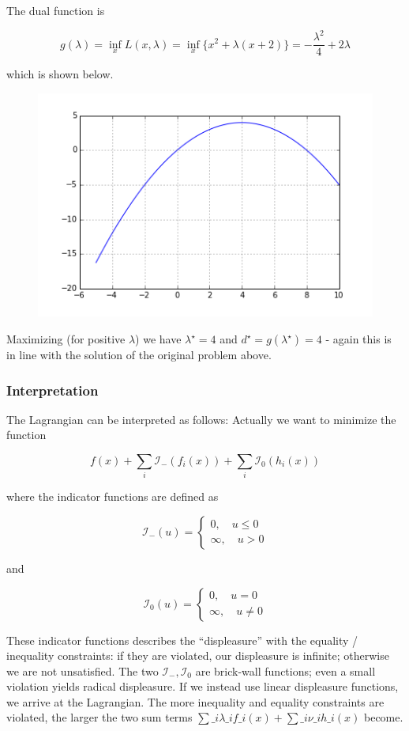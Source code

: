 The dual function is

\[
g(\lambda) = \inf_x L(x, \lambda) = \inf_x \big\{ x^2 + \lambda (x+2) \big\} = -\frac{\lambda^2}{4} + 2\lambda
\]

which is shown below.

\begin{figure}[H]
\includegraphics[scale=0.7]{images/convex_opt_04a.png}
\end{figure}

Maximizing (for positive $\lambda$) we have $\lambda^\star=4$ and $d^\star = g(\lambda^\star) = 4$ - again this is in line with the solution of the original problem above.

\subsubsection{Interpretation}

The Lagrangian can be interpreted as follows: Actually we want to
minimize the function

\[
f(x) + \sum_i \mathcal{I}_-(f_i(x)) + \sum_i \mathcal{I}_0(h_i(x))
\]

where the indicator functions are defined as

\[
\mathcal{I}_-(u)=
\begin{cases}
0, \quad u \leq 0 \\
\infty , \quad u > 0
\end{cases}
\]

and

\[
\mathcal{I}_0(u)=
\begin{cases}
0, \quad u = 0 \\
\infty , \quad u \neq 0
\end{cases}
\]

These indicator functions describes the ``displeasure'' with the
equality / inequality constraints: if they are violated, our displeasure is infinite; otherwise we are not unsatisfied. The two $\mathcal{I}_-, \mathcal{I}_0$ are brick-wall functions; even a small violation yields radical displeasure. If we instead use linear displeasure functions, we arrive at the Lagrangian. The more inequality and equality constraints are violated, the larger the two sum terms $ \sum\_i \lambda\_i f\_i(x) + \sum\_i \nu\_i h\_i(x) $ become.

